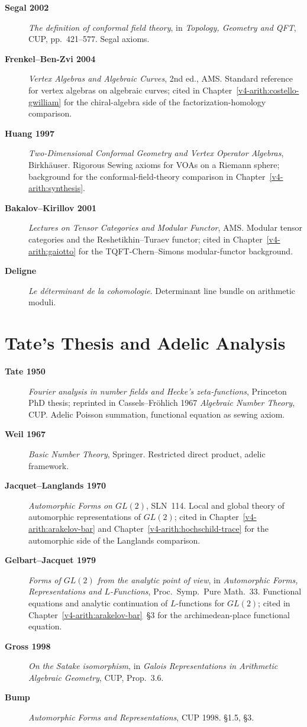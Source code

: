 \begin{description}
\item[\textbf{Segal 2002}] \emph{The definition of conformal field
theory}, in \emph{Topology, Geometry and QFT}, CUP, pp.~421--577.
Segal axioms.
\item[\textbf{Frenkel--Ben-Zvi 2004}] \emph{Vertex Algebras and
Algebraic Curves}, 2nd ed., AMS. Standard reference for vertex
algebras on algebraic curves; cited in
Chapter~\ref{v4-arith:costello-gwilliam} for the chiral-algebra
side of the factorization-homology comparison.
\item[\textbf{Huang 1997}] \emph{Two-Dimensional Conformal Geometry
and Vertex Operator Algebras}, Birkh\"auser. Rigorous
Sewing axioms for VOAs on a Riemann sphere; background for
the conformal-field-theory comparison in
Chapter~\ref{v4-arith:synthesis}.
\item[\textbf{Bakalov--Kirillov 2001}] \emph{Lectures on Tensor
Categories and Modular Functor}, AMS. Modular tensor categories
and the Reshetikhin--Turaev functor; cited in
Chapter~\ref{v4-arith:gaiotto} for the TQFT-Chern--Simons
modular-functor background.
\item[\textbf{Deligne}] \emph{Le d\'eterminant de la cohomologie}.
Determinant line bundle on arithmetic moduli.
\end{description}

\section{Tate's Thesis and Adelic Analysis}
\label{v4-arith:app:A:tate}

\begin{description}
\item[\textbf{Tate 1950}] \emph{Fourier analysis in number fields
and Hecke's zeta-functions}, Princeton PhD thesis; reprinted in
Cassels--Fr\"ohlich 1967 \emph{Algebraic Number Theory}, CUP.
Adelic Poisson summation, functional equation as sewing axiom.
\item[\textbf{Weil 1967}] \emph{Basic Number Theory}, Springer.
Restricted direct product, adelic framework.
\item[\textbf{Jacquet--Langlands 1970}] \emph{Automorphic Forms on
\(GL(2)\)}, SLN~114. Local and global theory of automorphic
representations of \(GL(2)\); cited in
Chapter~\ref{v4-arith:arakelov-bar} and
Chapter~\ref{v4-arith:hochschild-trace} for the
automorphic side of the Langlands comparison.
\item[\textbf{Gelbart--Jacquet 1979}] \emph{Forms of \(GL(2)\) from
the analytic point of view}, in \emph{Automorphic Forms,
Representations and \(L\)-Functions}, Proc.~Symp.~Pure Math.~33.
Functional equations and analytic continuation of \(L\)-functions
for \(GL(2)\); cited in Chapter~\ref{v4-arith:arakelov-bar}~\S3
for the archimedean-place functional equation.
\item[\textbf{Gross 1998}] \emph{On the Satake isomorphism}, in
\emph{Galois Representations in Arithmetic Algebraic Geometry},
CUP, Prop.~3.6.
\item[\textbf{Bump}] \emph{Automorphic Forms and Representations},
CUP 1998. \S1.5, \S3.
\end{description}

